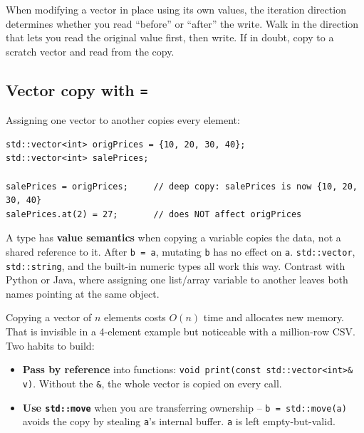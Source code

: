 \documentclass[11pt]{article}
\begin{document}
\begin{ideabox}
When modifying a vector in place using its own values, the iteration
direction determines whether you read ``before'' or ``after'' the
write. Walk in the direction that lets you read the original value
first, then write. If in doubt, copy to a scratch vector and read
from the copy.
\end{ideabox}

\subsection{Vector copy with \texttt{=}}

Assigning one vector to another copies every element:

\begin{lstlisting}
std::vector<int> origPrices = {10, 20, 30, 40};
std::vector<int> salePrices;

salePrices = origPrices;     // deep copy: salePrices is now {10, 20, 30, 40}
salePrices.at(2) = 27;       // does NOT affect origPrices
\end{lstlisting}

\begin{defnbox}
A type has \textbf{value semantics} when copying a variable copies
the data, not a shared reference to it. After \texttt{b = a}, mutating
\texttt{b} has no effect on \texttt{a}. \texttt{std::vector},
\texttt{std::string}, and the built-in numeric types all work this way.
Contrast with Python or Java, where assigning one list/array variable
to another leaves both names pointing at the same object.
\end{defnbox}

\begin{ideabox}
Copying a vector of $n$ elements costs $O(n)$ time and allocates new
memory. That is invisible in a 4-element example but noticeable with
a million-row CSV. Two habits to build:
\begin{itemize}
    \item \textbf{Pass by reference} into functions:
          \texttt{void print(const std::vector<int>\& v)}. Without the
          \texttt{\&}, the whole vector is copied on every call.
    \item \textbf{Use \texttt{std::move}} when you are transferring
          ownership -- \texttt{b = std::move(a)} avoids the copy by
          stealing \texttt{a}'s internal buffer. \texttt{a} is left
          empty-but-valid.
\end{itemize}
\end{ideabox}
\end{document}
